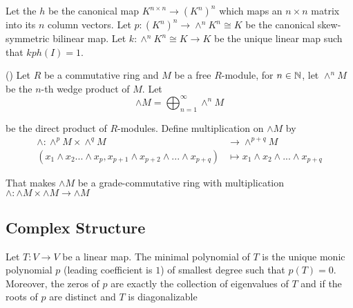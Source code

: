 \begin{definition}[determinant]
	Let the $h$ be the canonical map $K^{n \times n} \to (K^n)^n$ which maps an $n \times n$ matrix into its $n$ column vectors. Let $p: (K^n)^n \to \wedge^n K^n \cong K$ be the canonical skew-symmetric bilinear map. Let $k: \wedge^n K^n \cong K \to K$ be the unique linear map such that $k p h (I) = 1$.
	\begin{center}
	\end{center}
\end{definition}

\begin{remark}
	()
	Let $R$ be a commutative ring and $M$ be a free $R$-module, for $n \in \mathbb{N}$, let $\wedge^n M$ be the $n$-th wedge product of $M$. Let
	$$
		\wedge M = \bigoplus_{n=1}^\infty \wedge^n M
	$$
	
	be the direct product of $R$-modules. Define multiplication on $\wedge M$ by
	\begin{align*}
		\wedge: \wedge^p M \times \wedge^q M &\to \wedge^{p + q} M \\
						(x_1 \wedge x_2 ... \wedge x_p, x_{p+1} \wedge x_{p+2} \wedge ... \wedge x_{p+q}) &\mapsto x_1 \wedge x_2 \wedge ... \wedge x_{p+q}
	\end{align*}
	
	That makes $\wedge M$ be a grade-commutative ring with multiplication $\wedge: \wedge M \times \wedge M \to \wedge M$
\end{remark}

\subsection{Complex Structure}

\begin{definition}
	Let $T: V \to V$ be a linear map. The minimal polynomial of $T$ is the unique monic polynomial $p$ (leading coefficient is $1$) of smallest degree such that $p(T) = 0$. Moreover, the zeros of $p$ are exactly the collection of eigenvalues of $T$ and if the roots of $p$ are distinct and $T$ is diagonalizable
\end{definition}

